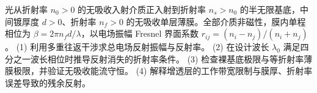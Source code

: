 光从折射率 \(n_0>0\) 的无吸收入射介质正入射到折射率 \(n_s>n_0\) 的半无限基底，中间镀厚度 \(d>0\)、折射率 \(n_f>0\) 的无吸收单层薄膜。全部介质非磁性，膜内单程相位为 \(\beta=2\pi n_fd/\lambda\)，以电场振幅 Fresnel 界面系数 \(r_{ij}=(n_i-n_j)/(n_i+n_j)\)。
(1) 利用多重往返干涉求总电场反射振幅与反射率。
(2) 在设计波长 \(\lambda_0\) 满足四分之一波长相位时推导反射消失的折射率条件。
(3) 检查裸基底极限与等折射率薄膜极限，并验证无吸收能流守恒。
(4) 解释增透层的工作带宽限制与膜厚、折射率误差导致的残余反射。
